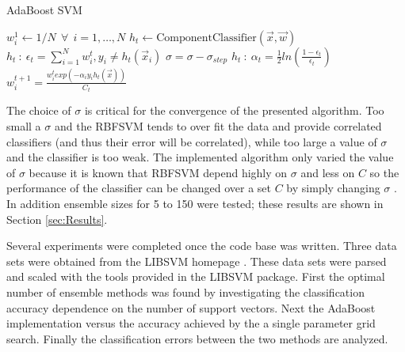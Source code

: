 \begin{algorithm}
\caption{AdaBoost SVM}
\label{algo:AdaBoostSVM}
\begin{algorithmic}[1]
\State $w_{i}^{1} \gets 1/N ~~\forall ~~ i=1,\dots,N$
    \label{marker}
    \State $h_t \gets \text{ComponentClassifier}(\vec{x},\vec{w})$
    \State $h_t~:~\epsilon_t = \sum_{i=1}^{N}w_{i}^{t} , y_i \ne h_t(\vec{x}_i)$
        \State $\sigma = \sigma - \sigma_{step}$
        \State {}
    \EndIf
    \State $h_t~:~\alpha_t = \frac{1}{2} ln\left ( \frac{1-\epsilon_t}{\epsilon_t}\right)$
    \State $w_i^{t+1} = \frac{w_i^{t} exp\left ( -\alpha_i y_i h_t(\vec{x})\right)}{C_t}$
\EndWhile
\Statex
{}
\EndProcedure
\end{algorithmic}
\end{algorithm}

The choice of $\sigma$ is critical for the convergence of the presented algorithm.
Too small a $\sigma$ and the RBFSVM tends to over fit the data and provide correlated classifiers (and thus their error will be correlated), while too large a value of $\sigma$ and the classifier is too weak.
The implemented algorithm only varied the value of $\sigma$ because it is known that RBFSVM depend highly on $\sigma$ and less on $C$ so the performance of the classifier can be changed over a set $C$ by simply changing $\sigma$ \cite{li_adaboost_2008}.
In addition ensemble sizes for 5 to 150 were tested; these results are shown in Section \ref{sec:Results}.

Several experiments were completed once the code base was written.
Three data sets were obtained from the LIBSVM homepage \cite{chang_libsvm:_2011}.
These data sets were parsed and scaled with the tools provided in the LIBSVM package.
First the optimal number of ensemble methods was found by investigating the classification accuracy dependence on the number of support vectors.
Next the AdaBoost implementation versus the accuracy achieved by the a single parameter grid search.
Finally the classification errors between the two methods are analyzed.
